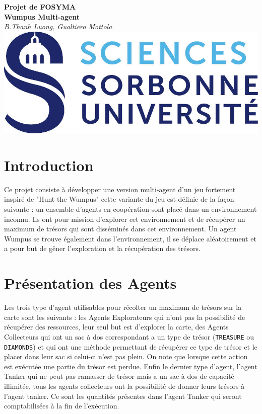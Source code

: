 \documentclass[10pt]{article}
\begin{document}
\begin{center}
	\textbf{\huge Projet de FOSYMA\\[.5cm] Wumpus Multi-agent}\\[.5cm]
	\vspace{1.5cm}
	\textit{\Large B.Thanh Luong, Gualtiero Mottola}\\
	\vspace{1.5cm}
	\includegraphics{logo}
	\vspace{1.5cm}
	\tableofcontents
\end{center}

\newpage

\section{Introduction}
	Ce projet consiste à développer une version multi-agent d'un jeu fortement inspiré de "Hunt the Wumpus"  cette variante du jeu est définie de la façon suivante : un ensemble d'agents en coopération sont placé dans un environnement inconnu. Ils ont pour mission d'explorer cet environnement et de récupérer un maximum de trésors qui sont disséminés dans cet environnement. Un agent Wumpus se trouve également dans l'environnement, il se déplace aléatoirement et a pour but de gêner l'exploration et la récupération des trésors.
	
\section{Présentation des Agents}
	Les trois type d'agent utilisables pour récolter un maximum de trésors sur la carte sont les suivants : les Agents Explorateurs qui n'ont pas la possibilité de récupérer des ressources, leur seul but est d'explorer la carte, des Agents Collecteurs qui ont un sac à dos correspondant a un type de trésor (\texttt{TREASURE} ou \texttt{DIAMONDS}) et qui ont une méthode permettant de récupérer ce type de trésor et le placer dans leur sac si celui-ci n'est pas plein. On note que lorsque cette action est exécutée une partie du trésor est perdue. Enfin le dernier type d'agent, l'agent Tanker qui ne peut pas ramasser de trésor mais a un sac à dos de capacité illimitée, tous les agents collecteurs ont la possibilité de donner leurs trésors à l'agent tanker. Ce sont les quantités présentes dans l'agent Tanker qui seront comptabilisées à la fin de l'exécution.
\end{document}
